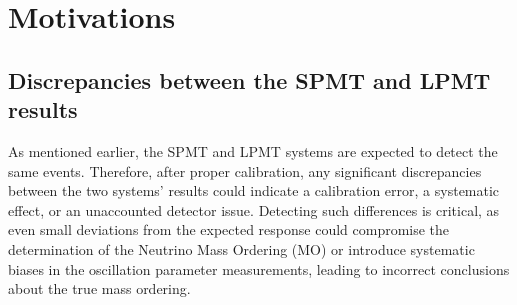 \documentclass[../main.tex]{subfiles}
\begin{document}
\section{Motivations}
%
%
%
\subsection{Discrepancies between the SPMT and LPMT results}

As mentioned earlier, the SPMT and LPMT systems are expected to detect the same events. Therefore, after proper calibration, any significant discrepancies between the two systems' results could indicate a calibration error, a systematic effect, or an unaccounted detector issue. Detecting such differences is critical, as even small deviations from the expected response could compromise the determination of the Neutrino Mass Ordering (MO) or introduce systematic biases in the oscillation parameter measurements, leading to incorrect conclusions about the true mass ordering.
\end{document}
